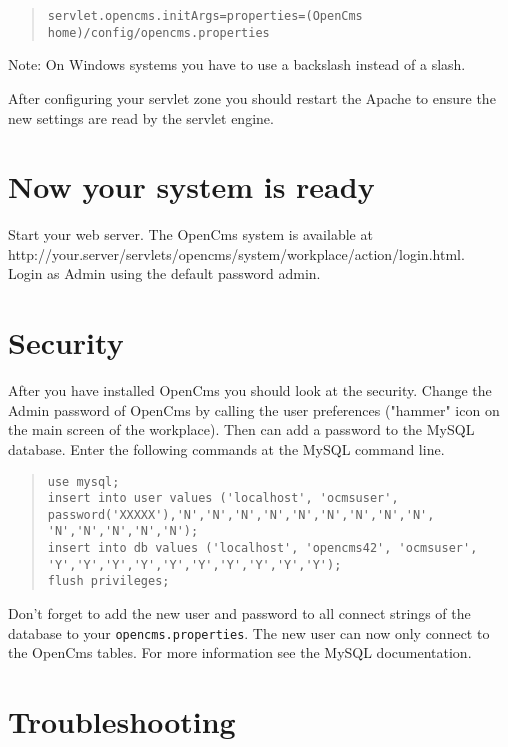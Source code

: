 \begin{quote}
\texttt{servlet.opencms.initArgs=properties=(OpenCms home)/config/opencms.properties}
\end{quote}
Note: On Windows systems you have to use a backslash instead of a slash. 

After configuring your servlet zone you should restart the Apache to
ensure the new settings are read by the servlet engine.

\section{Now your system is ready}

Start your web server. The OpenCms system is available at\\
http://your.server/servlets/opencms/system/workplace/action/login.html.\\
Login as Admin using the default password admin. 

\section{Security}

After you have installed OpenCms you should look at the security.
Change the Admin password of OpenCms by calling the user preferences 
("hammer" icon on the main screen of the workplace). 
Then can add a password to the MySQL database. Enter the following commands 
at the MySQL command line.\\ 

\begin{quote}
\begin{verbatim}
use mysql;
insert into user values ('localhost', 'ocmsuser',
password('XXXXX'),'N','N','N','N','N','N','N','N','N',
'N','N','N','N','N'); 
insert into db values ('localhost', 'opencms42', 'ocmsuser',
'Y','Y','Y','Y','Y','Y','Y','Y','Y','Y'); 
flush privileges; 
\end{verbatim}
\end{quote}

Don't forget to add the new user and password to all connect strings 
of the database to your \texttt{opencms.properties}. 
The new user can now only connect to the OpenCms tables. 
For more information see the MySQL documentation. 

\section{Troubleshooting}

